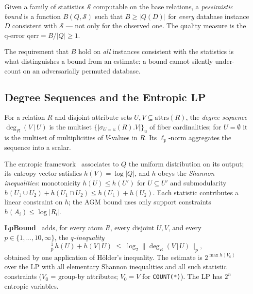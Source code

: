 \begin{definition}
\label{def:pce}
Given a family of statistics $\mathcal{S}$ computable on the base
relations, a \emph{pessimistic bound} is a function $B(Q,\mathcal{S})$
such that $B \ge |Q(D)|$ for \emph{every} database instance $D$
consistent with $\mathcal{S}$ --- not only for the observed one.
The quality measure is the q-error $\mathrm{qerr} = B/|Q| \ge 1$.
\end{definition}

The requirement that $B$ hold on \emph{all} instances consistent with
the statistics is what distinguishes a bound from an estimate: a bound
cannot silently under-count on an adversarially permuted database.

\subsection{Degree Sequences and the Entropic LP}

For a relation $R$ and disjoint attribute sets $U, V \subseteq
\mathrm{attrs}(R)$, the \emph{degree sequence} $\deg_R(V\,|\,U)$ is the
multiset $\{|\sigma_{U=u}(R).\!V|\}_u$ of fiber cardinalities; for
$U=\emptyset$ it is the multiset of multiplicities of $V$-values in
$R$.  Its $\ell_p$-norm aggregates the sequence into a scalar.

The entropic framework~\cite{atserias2013size,abokhamis2024lp}
associates to $Q$ the uniform distribution on its output; its entropy
vector satisfies $h(V) = \log|Q|$, and $h$ obeys the \emph{Shannon
inequalities}: monotonicity $h(U) \le h(U')$ for $U \subseteq U'$ and
submodularity $h(U_1\cup U_2) + h(U_1\cap U_2) \le h(U_1) + h(U_2)$.
Each statistic contributes a linear constraint on $h$; the AGM bound
uses only support constraints $h(A_i) \le \log|R_i|$.

\textbf{LpBound}~\cite{abokhamis2024lp,zhang2025lpbound} adds, for
every atom $R$, every disjoint $U,V$, and every $p \in \{1,\dots,10,
\infty\}$, the \emph{$q$-inequality}
\begin{equation}
\tfrac{1}{p}\, h(U) + h(V\,|\,U) \;\le\; \log_2 \|\deg_R(V\,|\,U)\|_p ,
\label{eq:qineq}
\end{equation}
obtained by one application of H\"older's inequality.  The estimate is
$2^{\max h(V_0)}$ over the LP with all elementary Shannon inequalities
and all such statistic constraints ($V_0$ = group-by attributes;
$V_0{=}V$ for \texttt{COUNT(*)}).  The LP has $2^n$ entropic
variables.

